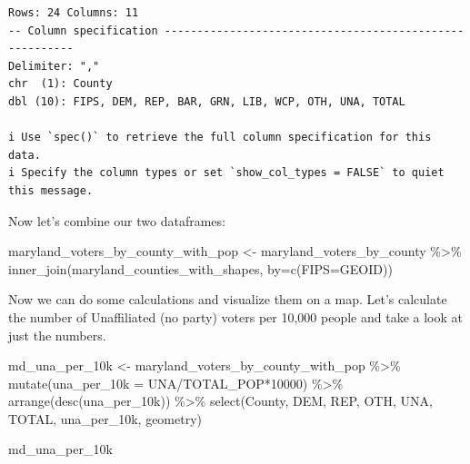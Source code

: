 \documentclass[
  letterpaper,
  DIV=11,
  numbers=noendperiod]{scrreprt}
\newenvironment{Shaded}{\begin{snugshade}}{\end{snugshade}}
\newcommand{\AttributeTok}[1]{\textcolor[rgb]{0.40,0.45,0.13}{#1}}
\newcommand{\DecValTok}[1]{\textcolor[rgb]{0.68,0.00,0.00}{#1}}
\newcommand{\FunctionTok}[1]{\textcolor[rgb]{0.28,0.35,0.67}{#1}}
\newcommand{\NormalTok}[1]{\textcolor[rgb]{0.00,0.23,0.31}{#1}}
\newcommand{\OtherTok}[1]{\textcolor[rgb]{0.00,0.23,0.31}{#1}}
\newcommand{\SpecialCharTok}[1]{\textcolor[rgb]{0.37,0.37,0.37}{#1}}
\newcommand{\StringTok}[1]{\textcolor[rgb]{0.13,0.47,0.30}{#1}}
\begin{document}
\begin{verbatim}
Rows: 24 Columns: 11
-- Column specification --------------------------------------------------------
Delimiter: ","
chr  (1): County
dbl (10): FIPS, DEM, REP, BAR, GRN, LIB, WCP, OTH, UNA, TOTAL

i Use `spec()` to retrieve the full column specification for this data.
i Specify the column types or set `show_col_types = FALSE` to quiet this message.
\end{verbatim}

Now let's combine our two dataframes:

\begin{Shaded}
\begin{Highlighting}[]
\NormalTok{maryland\_voters\_by\_county\_with\_pop }\OtherTok{\textless{}{-}}\NormalTok{ maryland\_voters\_by\_county }\SpecialCharTok{\%\textgreater{}\%} \FunctionTok{inner\_join}\NormalTok{(maryland\_counties\_with\_shapes, }\AttributeTok{by=}\FunctionTok{c}\NormalTok{(}\StringTok{\textquotesingle{}FIPS\textquotesingle{}}\OtherTok{=}\StringTok{\textquotesingle{}GEOID\textquotesingle{}}\NormalTok{))}
\end{Highlighting}
\end{Shaded}

Now we can do some calculations and visualize them on a map. Let's
calculate the number of Unaffiliated (no party) voters per 10,000 people
and take a look at just the numbers.

\begin{Shaded}
\begin{Highlighting}[]
\NormalTok{md\_una\_per\_10k }\OtherTok{\textless{}{-}}\NormalTok{ maryland\_voters\_by\_county\_with\_pop }\SpecialCharTok{\%\textgreater{}\%}
  \FunctionTok{mutate}\NormalTok{(}\AttributeTok{una\_per\_10k =}\NormalTok{ UNA}\SpecialCharTok{/}\NormalTok{TOTAL\_POP}\SpecialCharTok{*}\DecValTok{10000}\NormalTok{) }\SpecialCharTok{\%\textgreater{}\%}
  \FunctionTok{arrange}\NormalTok{(}\FunctionTok{desc}\NormalTok{(una\_per\_10k)) }\SpecialCharTok{\%\textgreater{}\%}
  \FunctionTok{select}\NormalTok{(County, DEM, REP, OTH, UNA, TOTAL, una\_per\_10k, geometry)}

\NormalTok{md\_una\_per\_10k}
\end{Highlighting}
\end{Shaded}
\end{document}
